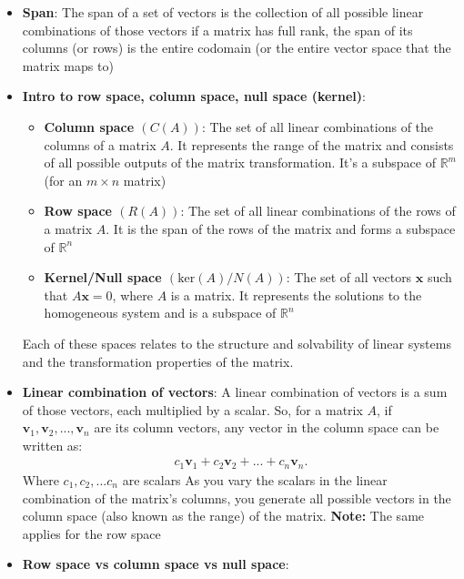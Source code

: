 \documentclass{report}
\begin{document}
\begin{itemize}
    \item \textbf{Span}: The span of a set of vectors is the collection of all possible linear combinations of those vectors
        \bigbreak \noindent 
        if a matrix has full rank, the span of its columns (or rows) is the entire codomain (or the entire vector space that the matrix maps to)
    \item \textbf{Intro to row space, column space, null space (kernel)}:
        \begin{itemize}
            \item \textbf{Column space $(C(A))$}:  The set of all linear combinations of the columns of a matrix $A$. It represents the range of the matrix and consists of all possible outputs of the matrix transformation. It's a subspace of $\mathbb{R}^{m}$ (for an $m\times n$ matrix)
            \item \textbf{Row space $(R(A))$}: The set of all linear combinations of the rows of a matrix $A$. It is the span of the rows of the matrix and forms a subspace of $\mathbb{R}^{n}$
            \item \textbf{Kernel/Null space $(\text{ker}(A)/N(A))$}: The set of all vectors $\mathbf{x}$ such that $A\mathbf{x}=0$, where $A$ is a matrix. It represents the solutions to the homogeneous system and is a subspace of $\mathbb{R}^{n}$
        \end{itemize}
        \bigbreak \noindent 
        Each of these spaces relates to the structure and solvability of linear systems and the transformation properties of the matrix.
    \item \textbf{Linear combination of vectors}: A linear combination of vectors is a sum of those vectors, each multiplied by a scalar. So, for a matrix $A$, if $\mathbf{v}_{1}, \mathbf{v}_{2}, ..., \mathbf{v}_{n}$ are its column vectors, any vector in the column space can be written as:
        \begin{align*}
            c_{1}\mathbf{v}_{1} + c_{2}\mathbf{v}_{2} + ... + c_{n}\mathbf{v}_{n}
        .\end{align*}
        \bigbreak \noindent 
        Where $c_{1}, c_{2}, ... c_{n}$ are scalars
        \bigbreak \noindent 
        As you vary the scalars in the linear combination of the matrix's columns, you generate all possible vectors in the column space (also known as the range) of the matrix.
        \bigbreak \noindent 
        \textbf{Note:} The same applies for the row space
    \item \textbf{Row space vs column space vs null space}:

\end{itemize}
\end{document}
